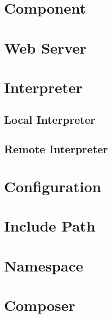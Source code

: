 \section{Component}



\section{Web Server}



\section{Interpreter}


\subsection{Local Interpreter}


\subsection{Remote Interpreter}


\section{Configuration}



\section{Include Path}



\section{Namespace}



\section{Composer}






